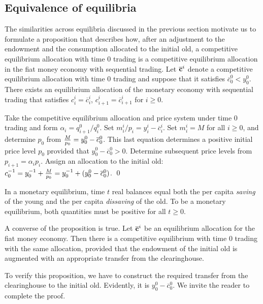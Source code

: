 \subsection{Equivalence of equilibria}
The similarities across equilibria discussed in the previous section motivate us to formulate a  proposition that describes how,
after an adjustment to the endowment and the consumption allocated
to the initial old, a competitive equilibrium
allocation with time $0$ trading
is a competitive equilibrium  allocation in the fiat money economy with
sequential trading.
\medskip
{}  Let $\overline {\bf c}^i$ denote a competitive equilibrium
 allocation with time $0$ trading
  and suppose that it satisfies
$\overline c^0_0 < y^0_0$.
There exists
an equilibrium allocation  of the monetary economy with sequential trading 
 that satisfies $c^i_i = \overline c^i_i$, $c^i_{i+1} = \overline
c^i_{i+1}$ for $i \geq 0$.

\medskip
{}  Take the competitive equilibrium allocation
and  price system under time 0 trading 
and form $ \alpha_i = q^0_{i+1}/q^0_i$.  Set
$m_i^i/p_i = y_i^i - \overline c_i^i$. Set $m_i^i = M$ for all $i \geq 0$,
and   determine $p_0$ from ${M \over p_0} = y_0^0  - \overline c_0^0$.
This last equation determines a positive initial price level
$p_0$ provided that $y_0^0 - \overline c_0^0 >0$.  Determine
subsequent price levels from $p_{i+1} = \alpha_i p_i$.
Assign an allocation to the  initial old: %
$c^{-1}_0 = y^{-1}_0 + {M \over p_0} = y^{-1}_0 +(y_0^0 - \overline c_0^0)$.  \qed

\medskip
In a monetary equilibrium, time $t$ real balances
equal both the per capita {\it saving\/} of the young and the
per capita {\it dissaving\/} of the old. To be a monetary equilibrium, both quantities must
be positive for all $t \geq 0$.


A converse of the proposition is true.
\medskip
{}  Let    $\overline {\bf c}^i$ be an
equilibrium allocation for the fiat money economy.    Then
there is a competitive equilibrium with time $0$ trading
with the same allocation, provided that the endowment
of the initial old is augmented with an appropriate  transfer
from the clearinghouse.
\medskip

To  verify this proposition, we have to construct
the required transfer from the clearinghouse to the initial
old.  Evidently, it is $y^0_0 - \overline c^0_0$.  We invite
the reader to complete  the proof.



